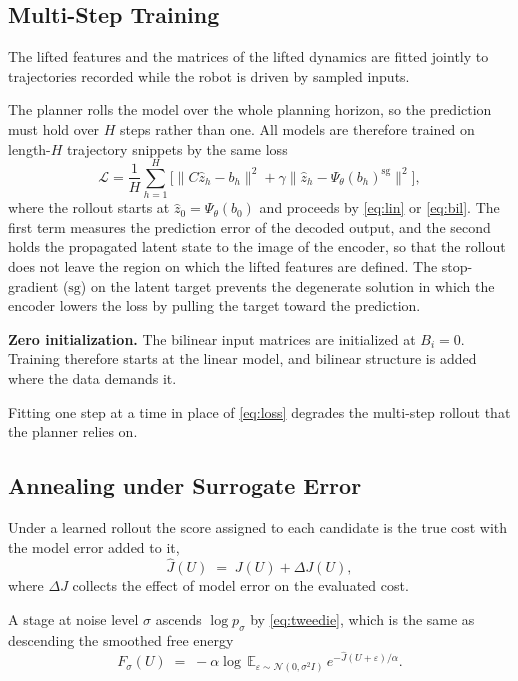 \documentclass[letterpaper,10pt,conference]{ieeeconf}
\begin{document}
\subsection{Multi-Step Training}\label{subsec:training}

The lifted features and the matrices of the lifted dynamics are fitted jointly to trajectories recorded while the robot is driven by sampled inputs.

The planner rolls the model over the whole planning horizon, so the prediction must hold over $H$ steps rather than one.
All models are therefore trained on length-$H$ trajectory snippets by the same loss
\begin{equation}
\mathcal{L} = \frac{1}{H} \sum_{h=1}^{H}
\Big[ \big\| C \hat{z}_h - b_h \big\|^{2}
+ \gamma \big\| \hat{z}_h - \Psi_\theta(b_h)^{\mathrm{sg}} \big\|^{2}
\Big],
\label{eq:loss}
\end{equation}
where the rollout starts at $\hat z_0 = \Psi_\theta(b_0)$ and proceeds by \eqref{eq:lin} or \eqref{eq:bil}.
The first term measures the prediction error of the decoded output, and the second holds the propagated latent state to the image of the encoder, so that the rollout does not leave the region on which the lifted features are defined.
The stop-gradient ($\mathrm{sg}$) on the latent target prevents the degenerate solution in which the encoder lowers the loss by pulling the target toward the prediction.

\textbf{Zero initialization.}
The bilinear input matrices are initialized at $B_i = 0$.
Training therefore starts at the linear model, and bilinear structure is added where the data demands it.

Fitting one step at a time in place of \eqref{eq:loss} degrades the multi-step rollout that the planner relies on.

\subsection{Annealing under Surrogate Error}\label{subsec:anneal_theory}

Under a learned rollout the score assigned to each candidate is the true cost with the model error added to it,
\begin{equation}
\hat J(U) \;=\; J(U) + \Delta J(U),
\label{eq:jhat}
\end{equation}
where $\Delta J$ collects the effect of model error on the evaluated cost.

A stage at noise level $\sigma$ ascends $\log p_\sigma$ by \eqref{eq:tweedie}, which is the same as descending the smoothed free energy
\begin{equation}
F_\sigma(U) \;=\; -\alpha \log\, \mathbb{E}_{\varepsilon \sim \mathcal{N}(0, \sigma^{2} I)}\,
e^{-\hat J(U + \varepsilon)/\alpha} .
\label{eq:freeenergy}
\end{equation}
\end{document}
